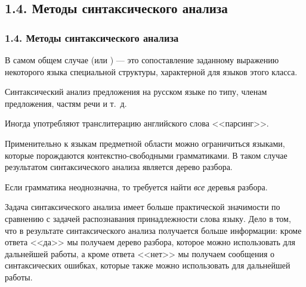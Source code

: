 \subsection{1.4. Методы синтаксического анализа}\label{1.4.}
\begin{frame}
\frametitle{1.4. Методы синтаксического анализа}
В самом общем случае  
(или ) --- это
сопоставление заданному выражению некоторого языка специальной
структуры, характерной для языков этого класса.
\begin{example}
Синтаксический анализ предложения на русском языке по типу, 
членам предложения, частям речи и т.~д. 
\end{example}
\begin{remark} Иногда употребляют транслитерацию английского слова <<парсинг>>. 
\end{remark}

\smallskip
Применительно к языкам предметной области 
можно ограничиться языками, которые
порождаются контекстно-свободными грамматиками.
В таком случае результатом синтаксического анализа
является дерево разбора. 

\smallskip
\begin{remark}
Если грамматика неоднозначна, то требуется
найти {\em все} деревья разбора. 
\end{remark} 
    
\begin{digress}
Задача синтаксического анализа имеет больше 
практической значимости по сравнению с задачей
распознавания принадлежности слова языку.
Дело в том, что в результате синтаксического
анализа получается больше информации:
кроме ответа <<да>> мы получаем дерево разбора,
которое можно использовать для дальнейшей работы,
а кроме ответа <<нет>> мы получаем сообщения о синтаксических ошибках,
которые также можно использовать для дальнейшей работы. 
\end{digress}
\end{frame}


